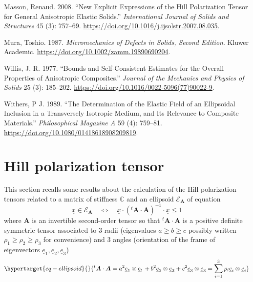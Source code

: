 \documentclass[
  letterpaper,
  DIV=11,
  numbers=noendperiod]{scrreprt}
\newlength{\cslhangindent}
\newlength{\cslentryspacingunit} %
\newenvironment{CSLReferences}[2] %
 {%
  \setlength{\parindent}{0pt}
  \ifodd #1
  \let\oldpar\par
  \def\par{\hangindent=\cslhangindent\oldpar}
  \fi
  \setlength{\parskip}{#2\cslentryspacingunit}
 }%
 {}
\begin{document}
\begin{CSLReferences}{1}{0}
\leavevmode{}%
Masson, Renaud. 2008. {``New Explicit Expressions of the {Hill}
Polarization Tensor for General Anisotropic Elastic Solids.''}
\emph{International Journal of Solids and Structures} 45 (3): 757--69.
\url{https://doi.org/10.1016/j.ijsolstr.2007.08.035}.

\leavevmode{}%
Mura, Toshio. 1987. \emph{Micromechanics of {Defects} in {Solids},
{Second Edition}}. {Kluwer Academic}.
\url{https://doi.org/10.1002/zamm.19890690204}.

\leavevmode{}%
Willis, J. R. 1977. {``Bounds and Self-Consistent Estimates for the
Overall Properties of Anisotropic Composites.''} \emph{Journal of the
Mechanics and Physics of Solids} 25 (3): 185--202.
\url{https://doi.org/10.1016/0022-5096(77)90022-9}.

\leavevmode{}%
Withers, P J. 1989. {``The Determination of the Elastic Field of an
Ellipsoidal Inclusion in a Transversely Isotropic Medium, and Its
Relevance to Composite Materials.''} \emph{Philosophical Magazine A} 59
(4): 759--81. \url{https://doi.org/10.1080/01418618908209819}.

\end{CSLReferences}

\appendix
{}

\hypertarget{hill-polarization-tensor}{%
\chapter{Hill polarization tensor}\label{hill-polarization-tensor}}

This section recalls some results about the calculation of the Hill
polarization tensors related to a matrix of stiffness \(\mathbb{C}\) and
an ellipsoid \(\mathcal{E}_{{\mathbf{\boldsymbol{{A}}}}}\) of equation
\[
{\underline{{x}}}\in\mathcal{E}_{{\mathbf{\boldsymbol{{A}}}}}
\quad\Leftrightarrow\quad
{\underline{{x}}}\cdot({{}^{t}{{\mathbf{\boldsymbol{{A}}}}}}\cdot{\mathbf{\boldsymbol{{A}}}})^{-1}\cdot{\underline{{x}}}\leq 1
\] where \({\mathbf{\boldsymbol{{A}}}}\) is an invertible second-order
tensor so that
\({{}^{t}{{\mathbf{\boldsymbol{{A}}}}}}\cdot{\mathbf{\boldsymbol{{A}}}}\)
is a positive definite symmetric tensor associated to 3 radii
(eigenvalues \(a\geq b \geq c\) possibly written
\(\rho_1 \geq \rho_2 \geq \rho_3\) for convenience) and 3 angles
(orientation of the frame of eigenvectors
\({\underline{{e}}}_1, {\underline{{e}}}_2, {\underline{{e}}}_3\))
\begin{equation}\protect\hypertarget{eq-ellipsoid}{}{
{{}^{t}{{\mathbf{\boldsymbol{{A}}}}}}\cdot{\mathbf{\boldsymbol{{A}}}}=a^2 {\underline{{e}}}_1\otimes{\underline{{e}}}_1 + b^2 {\underline{{e}}}_2\otimes{\underline{{e}}}_2 + c^2 {\underline{{e}}}_3\otimes{\underline{{e}}}_3 = \sum_{i=1}^3 \rho_i {\underline{{e}}}_i\otimes{\underline{{e}}}_i
}\label{eq-ellipsoid}\end{equation}
\end{document}

